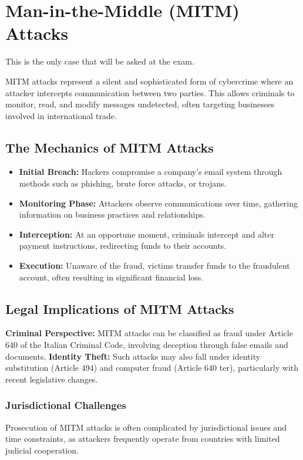 \section{Man-in-the-Middle (MITM) Attacks}
\begin{boxH}
  This is the only case that will be asked at the exam.
\end{boxH}
MITM attacks represent a silent and sophisticated form of cybercrime where an
attacker intercepts communication between two parties. This allows criminals to
monitor, read, and modify messages undetected, often targeting businesses
involved in international trade.

\subsection{The Mechanics of MITM Attacks}
\begin{itemize}
    \item \textbf{Initial Breach:} Hackers compromise a company's email system
      through methods such as phishing, brute force attacks, or trojans.
    \item \textbf{Monitoring Phase:} Attackers observe communications over
      time, gathering information on business practices and relationships.
    \item \textbf{Interception:} At an opportune moment, criminals intercept
      and alter payment instructions, redirecting funds to their accounts.
    \item \textbf{Execution:} Unaware of the fraud, victims transfer funds to
      the fraudulent account, often resulting in significant financial loss.
\end{itemize}

\subsection{Legal Implications of MITM Attacks}
\textbf{Criminal Perspective:} MITM attacks can be classified as fraud under
Article 640 of the Italian Criminal Code, involving deception through false
emails and documents. \textbf{Identity Theft:} Such attacks may also fall under
identity substitution (Article 494) and computer fraud (Article 640 ter),
particularly with recent legislative changes.

\subsubsection{Jurisdictional Challenges}
Prosecution of MITM attacks is often complicated by jurisdictional issues and
time constraints, as attackers frequently operate from countries with limited
judicial cooperation.

